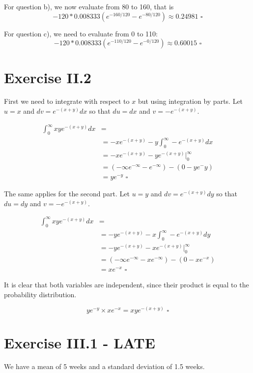 \documentclass[titlepage, letterpaper]{article}
\newcommand{\qed}{\,\,\square}
\begin{document}
For question b), we now evaluate from 80 to 160, that is
$$-120 * 0.008333(e^{-160/120} - e^{-80/120}) \approx 0.24981 \qed$$

For question c), we need to evaluate from 0 to 110:
$$-120 * 0.008333 (e^{-110/120} - e^{-0/120}) \approx 0.60015\qed$$

\section{Exercise II.2} %
\label{sec:exercise_ii_2}

First we need to integrate with respect to $x$ but using integration by parts.
Let $u = x$ and $dv = e^{-(x+y)}dx$ so that $du = dx$ and $v = -e^{-(x+y)}$.

\begin{align}
    \int_0^\infty xy e^{-(x+y)}dx &= \\
    & = -x e^{-(x+y)} - y\int_0^\infty -e^{-(x+y)}dx \\
    & = -xe^{-(x+y)} - ye^{-(x+y)}\Big|_0^\infty\\[3ex]
    & = (-\infty e^{-\infty} - e^{-\infty}) - (0 - ye^-y) \\
    & = ye^{-y} \qed 
\end{align}

The same applies for the second part.
Let $u = y$ and $dv = e^{-(x+y)}dy$ so that $du = dy$ and $v = -e^{-(x+y)}$.

\begin{align}
    \int_0^\infty xy e^{-(x+y)}dx &= \\
    & = -ye^{-(x+y)} - x\int_0^\infty - e^{-(x+y)}dy \\
    & = -ye^{-(x+y)} - xe^{-(x+y)}\Big|_0^\infty \\[3ex]
    & = (-\infty e^{-\infty} - xe^{-\infty}) - (0 - xe^{-x}) \\
    & = xe^{-x} \qed
\end{align}

It is clear that both variables are independent, since their product is equal to the probability distribution.

$$ye^{-y} \times xe^{-x} = xy e^{-(x+y)} \qed$$


\section{Exercise III.1 - LATE} %
\label{sec:exercise_iii_1}
We have a mean of 5 weeks and a standard deviation of 1.5 weeks.
\end{document}
